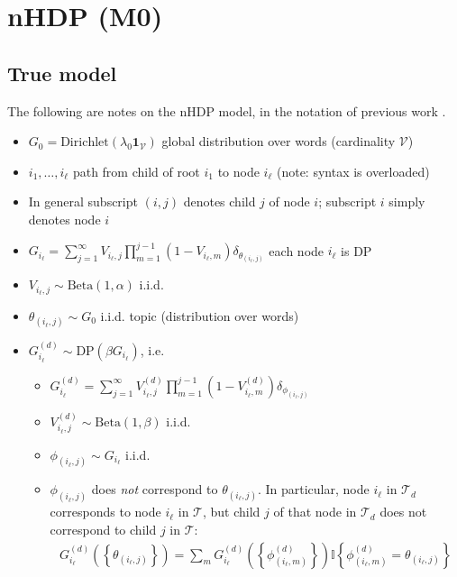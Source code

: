 \documentclass{article}
\newcommand{\Beta}{\ensuremath{\mathrm{Beta}}}
\newcommand{\Dirichlet}{\ensuremath{\mathrm{Dirichlet}}}
\newcommand{\DP}{\ensuremath{\mathrm{DP}}}
\newcommand{\T}{\ensuremath{\mathcal{T}}}
\newcommand{\V}{\ensuremath{\mathcal{V}}}
\newcommand{\I}{\ensuremath{\mathbb{I}}}
\newcommand{\one}{\ensuremath{\mathbf{1}}}
\begin{document}
\section*{nHDP (M0)}


\subsection*{True model}

The following are notes on the nHDP model, in the notation of previous work \cite{paisley2013}.

\begin{itemize}
\item $\displaystyle G_0 = \Dirichlet\left(\lambda_0 \one_\V\right)$ global distribution over words (cardinality $\V$)
\item $\displaystyle i_1, \ldots, i_\ell$ path from child of root $i_1$ to node $i_\ell$ (note: syntax is overloaded)
\item In general subscript $(i,j)$ denotes child $j$ of node $i$; subscript $i$ simply denotes node $i$
\item $\displaystyle G_{i_\ell} = \sum_{j=1}^{\infty}{ V_{i_\ell,j} \prod_{m=1}^{j-1}{ \left(1 - V_{i_\ell,m}\right) \delta_{\theta_{(i_\ell,j)}} }}$ each node $i_\ell$ is DP
\item $\displaystyle V_{i_\ell,j} \sim \Beta(1, \alpha)$ i.i.d.
\item $\displaystyle \theta_{(i_\ell,j)} \sim G_0$ i.i.d. topic (distribution over words)
\item $\displaystyle G_{i_\ell}^{(d)} \sim \DP\left(\beta G_{i_\ell}\right)$, i.e.
    \begin{itemize}
    \item $\displaystyle G_{i_\ell}^{(d)} = \sum_{j=1}^{\infty}{ V_{i_\ell,j}^{(d)} \prod_{m=1}^{j-1}{ \left(1 - V_{i_\ell,m}^{(d)}\right) \delta_{\phi_{(i_\ell,j)}} }}$
    \item $\displaystyle V_{i_\ell,j}^{(d)} \sim \Beta(1, \beta)$ i.i.d.
    \item $\displaystyle \phi_{(i_\ell,j)} \sim G_{i_\ell}$ i.i.d.
    \item $\phi_{(i_\ell,j)}$ does \emph{not} correspond to $\theta_{(i_\ell,j)}$.  In particular, node $i_\ell$ in $\T_d$ corresponds to node $i_\ell$ in $\T$, but child $j$ of that node in $\T_d$ does not correspond to child $j$ in $\T$:
        \begin{align*}
            G_{i_\ell}^{(d)}\left(\left\{\theta_{(i_\ell,j)}\right\}\right) = \sum_m{G_{i_\ell}^{(d)}\left(\left\{\phi_{(i_\ell,m)}^{(d)}\right\}\right) \I\left\{\phi_{(i_\ell,m)}^{(d)} = \theta_{(i_\ell,j)}\right\}}

\end{align*}
\end{itemize}
\end{itemize}
\end{document}
